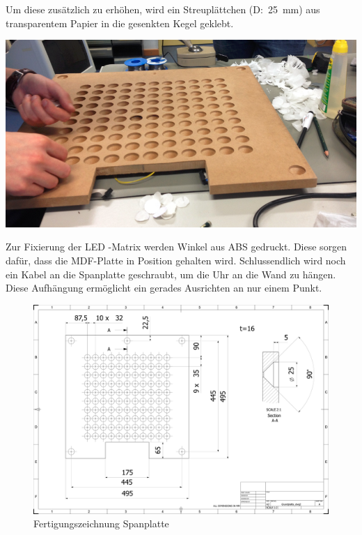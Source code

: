 \begin{multicols}{2}
{}
Um diese zusätzlich zu erhöhen, wird ein Streuplättchen (D:~25~mm) aus transparentem Papier in die gesenkten Kegel geklebt. 

{
\centering\includegraphics[width=0.85\columnwidth]{Abbildungen/Konstruktion/LED02}

}

Zur Fixierung der LED -Matrix werden Winkel aus ABS gedruckt. Diese sorgen dafür, dass die MDF-Platte in Position gehalten wird. Schlussendlich wird noch ein Kabel an die Spanplatte geschraubt, um die Uhr an die Wand zu hängen. Diese Aufhängung ermöglicht ein gerades Ausrichten an nur einem Punkt. 


\end{multicols}

\begin{landscape}
	\begin{figure}
		\centering
		\includegraphics[width=21cm]{Abbildungen/Konstruktion/Grundplatte}
		\caption[Spanplatte]{Fertigungszeichnung Spanplatte}
		\label{fig:Spanplatte}
	\end{figure}
\end{landscape}


